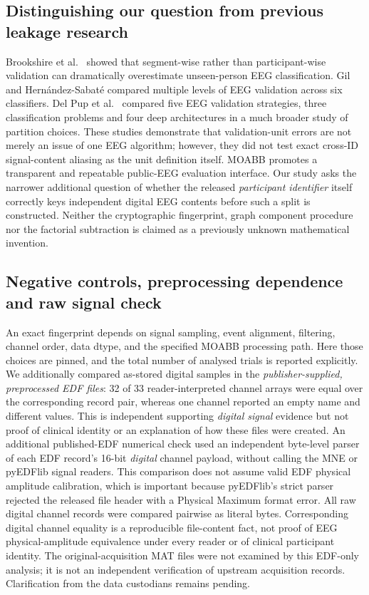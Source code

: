 \subsection{Distinguishing our question from previous leakage research}
\label{sec:p2-related-novelty}
Brookshire et al.\ \cite{brookshire2024leakage}
showed that segment-wise rather than participant-wise
validation can dramatically overestimate unseen-person
EEG classification. Gil and Hern\'andez-Sabat\'e
\cite{gil2026subjectvalidation} compared multiple
levels of EEG validation across six classifiers.
Del Pup et al.\ \cite{delpup2025partition} compared five EEG
validation strategies, three classification problems and
four deep architectures in a much broader study of
partition choices. These studies demonstrate that
validation-unit errors are not merely an issue of one EEG algorithm; however, they did not test exact cross-ID signal-content aliasing as the unit definition itself.
MOABB \cite{jayaram2018moabb} promotes a transparent
and repeatable public-EEG evaluation interface.
Our study asks the narrower additional question of
whether the released \emph{participant identifier}
itself correctly keys independent digital EEG contents
before such a split is constructed.
Neither the cryptographic fingerprint, graph component
procedure nor the factorial subtraction is claimed as
a previously unknown mathematical invention.

\subsection{Negative controls, preprocessing dependence and raw signal check}
\label{sec:p2-controls}
An exact fingerprint depends on signal sampling,
event alignment, filtering, channel order, data dtype,
and the specified MOABB processing path.
Here those choices are pinned, and the total number
of analysed trials is reported explicitly.
We additionally compared as-stored digital samples in the
\emph{publisher-supplied, preprocessed EDF files}:
32 of 33 reader-interpreted channel arrays were equal
over the corresponding record pair, whereas one
channel reported an empty name and different values.
This is independent supporting \emph{digital signal}
evidence but not proof of clinical identity or an
explanation of how these files were created.
An additional published-EDF numerical check used an
independent byte-level parser of each EDF record's 16-bit
\emph{digital} channel payload, without calling the MNE or
pyEDFlib signal readers. This comparison does not assume
valid EDF physical amplitude calibration, which is
important because pyEDFlib's strict parser rejected the
released file header with a Physical Maximum format error.
All raw digital channel records were compared pairwise
as literal bytes. Corresponding digital channel equality
is a reproducible file-content fact, not proof of EEG
physical-amplitude equivalence under every reader or of
clinical participant identity. The original-acquisition MAT files were not examined by
this EDF-only analysis; it is not an independent
verification of upstream acquisition records.
Clarification from the data custodians remains pending.

